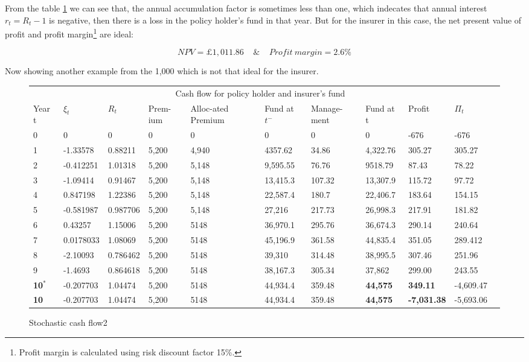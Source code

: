 \documentclass{report}
\begin{document}
From the table \ref{stoch-cashflow} we can see that, the annual accumulation factor is sometimes less than one, which indecates that annual interest $r_t = R_t - 1$ is negative, then there is a loss in the policy holder's fund in that year. But for the insurer in this case, the net present value of profit and profit margin\footnote{Profit margin is calculated using risk discount factor 15\%.} are ideal: 

\[
NPV=\pounds 1,011.86\ \ \ \   \   \& \    \ \ \ \       Profit \  margin = 2.6\%
\]

Now showing another example from the 1,000 which is not that ideal for the insurer.

\begin{figure}[H]
\begin{tabular}{p{0.5cm} p{1.5cm} p{1.3cm} p{1cm} p{1.5cm} p{1.2cm} p{1.3cm} p{1.3cm}p{1.6cm}p{1.5cm}p{1.3cm} }
\toprule
\multicolumn{10}{c}{Cash flow for policy holder and insurer's fund} \\
\cmidrule(r){3-8}

Year t & $\xi_t$ &$R_t$ & Prem-ium & Alloc-ated Premium & Fund at $t^-$ &Manage-ment & Fund at t& Profit& $\Pi_t$ \\
\midrule
0&0&0&0&0&0&0&0&-676&-676\\
1&-1.33578&0.88211&5,200&4,940&4357.62&34.86&4,322.76&305.27&305.27\\
2&-0.412251&1.01318&5,200&5,148&9,595.55&76.76&9518.79&87.43&78.22\\
3&-1.09414&0.91467&5,200&5,148&13,415.3&107.32&13,307.9&115.72&97.72\\
4&0.847198&1.22386&5,200&5,148&22,587.4&180.7&22,406.7&183.64&154.15\\
5&-0.581987&0.987706&5,200&5,148&27,216&217.73&26,998.3&217.91&181.82\\
6&0.43257&1.15006&5,200&5148&36,970.1&295.76&36,674.3&290.14&240.64\\
7&0.0178033&1.08069&5,200&5148&45,196.9&361.58&44,835.4&351.05&289.412\\
8&-2.10093&0.786462&5,200&5148&39,310&314.48&38,995.5&307.46&251.96\\
9&-1.4693&0.864618&5,200&5148&38,167.3&305.34&37,862&299.00&243.55\\
\textbf{10$^*$}&-0.207703&1.04474&5,200&5148&44,934.4&359.48&\textbf{44,575}&\textbf{349.11}&-4,609.47\\
\textbf{10}&-0.207703&1.04474&5,200&5148&44,934.4&359.48&\textbf{44,575}&\textbf{-7,031.38}&-5,693.06\\

\bottomrule
\end{tabular}
\caption{Stochastic cash flow2}
\label{stoch-cashflow}
\end{figure}
\end{document}

